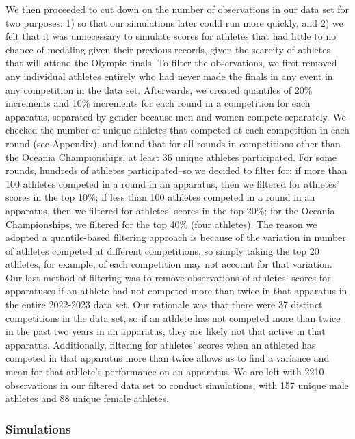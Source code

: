 \documentclass[
  letterpaper,
  DIV=11,
  numbers=noendperiod]{scrartcl}
\begin{document}
We then proceeded to cut down on the number of observations in our data
set for two purposes: 1) so that our simulations later could run more
quickly, and 2) we felt that it was unnecessary to simulate scores for
athletes that had little to no chance of medaling given their previous
records, given the scarcity of athletes that will attend the Olympic
finals. To filter the observations, we first removed any individual
athletes entirely who had never made the finals in any event in any
competition in the data set. Afterwards, we created quantiles of 20\%
increments and 10\% increments for each round in a competition for each
apparatus, separated by gender because men and women compete separately.
We checked the number of unique athletes that competed at each
competition in each round (see Appendix), and found that for all rounds
in competitions other than the Oceania Championships, at least 36 unique
athletes participated. For some rounds, hundreds of athletes
participated--so we decided to filter for: if more than 100 athletes
competed in a round in an apparatus, then we filtered for athletes'
scores in the top 10\%; if less than 100 athletes competed in a round in
an apparatus, then we filtered for athletes' scores in the top 20\%; for
the Oceania Championships, we filtered for the top 40\% (four athletes).
The reason we adopted a quantile-based filtering approach is because of
the variation in number of athletes competed at different competitions,
so simply taking the top 20 athletes, for example, of each competition
may not account for that variation. Our last method of filtering was to
remove observations of athletes' scores for apparatuses if an athlete
had not competed more than twice in that apparatus in the entire
2022-2023 data set. Our rationale was that there were 37 distinct
competitions in the data set, so if an athlete has not competed more
than twice in the past two years in an apparatus, they are likely not
that active in that apparatus. Additionally, filtering for athletes'
scores when an athleted has competed in that apparatus more than twice
allows us to find a variance and mean for that athlete's performance on
an apparatus. We are left with 2210 observations in our filtered data
set to conduct simulations, with 157 unique male athletes and 88 unique
female athletes.

\hypertarget{simulations}{%
\subsubsection{Simulations}\label{simulations}}
\end{document}
